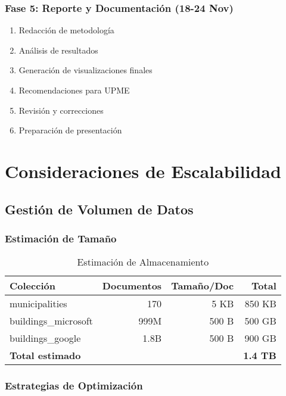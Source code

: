 \documentclass[12pt,a4paper]{article}
\begin{document}
\subsubsection{Fase 5: Reporte y Documentación (18-24 Nov)}

\begin{enumerate}
    \item Redacción de metodología
    \item Análisis de resultados
    \item Generación de visualizaciones finales
    \item Recomendaciones para UPME
    \item Revisión y correcciones
    \item Preparación de presentación
\end{enumerate}

\newpage
\section{Consideraciones de Escalabilidad}

\subsection{Gestión de Volumen de Datos}

\subsubsection{Estimación de Tamaño}

\begin{table}[h]
\centering
\caption{Estimación de Almacenamiento}
\begin{tabular}{@{}lrrr@{}}
\toprule
\textbf{Colección} & \textbf{Documentos} & \textbf{Tamaño/Doc} & \textbf{Total} \\ \midrule
municipalities & 170 & 5 KB & 850 KB \\
buildings\_microsoft & 999M & 500 B & 500 GB \\
buildings\_google & 1.8B & 500 B & 900 GB \\
\textbf{Total estimado} &  &  & \textbf{1.4 TB} \\ \bottomrule
\end{tabular}
\end{table}

\subsubsection{Estrategias de Optimización}
\end{document}
